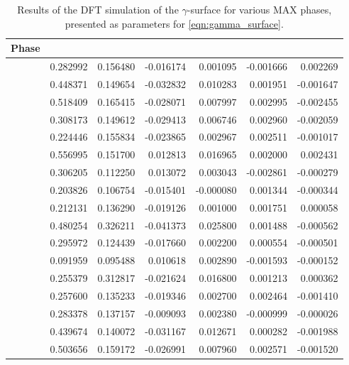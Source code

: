 \begin{table}
\centering
\begin{tabular}{|l|d{6}|d{6}|d{6}|d{6}|d{6}|d{6}|}
\hline
   Phase\rule[3ex]{0pt}{0pt} &         &         &         &         &         &         \\
\hline
   \rule[3ex]{0pt}{0pt}   &  0.282992 &  0.156480 & -0.016174 &  0.001095 & -0.001666 &  0.002269 \\
                         &  0.448371 &  0.149654 & -0.032832 &  0.010283 &  0.001951 & -0.001647 \\
                        &  0.518409 &  0.165415 & -0.028071 &  0.007997 &  0.002995 & -0.002455 \\
                         &  0.308173 &  0.149612 & -0.029413 &  0.006746 &  0.002960 & -0.002059 \\
                         &  0.224446 &  0.155834 & -0.023865 &  0.002967 &  0.002511 & -0.001017 \\
                          &  0.556995 &  0.151700 &  0.012813 &  0.016965 &  0.002000 &  0.002431 \\
                         &  0.306205 &  0.112250 &  0.013072 &  0.003043 & -0.002861 & -0.000279 \\
                         &  0.203826 &  0.106754 & -0.015401 & -0.000080 &  0.001344 & -0.000344 \\
                         &  0.212131 &  0.136290 & -0.019126 &  0.001000 &  0.001751 &  0.000058 \\
                          &  0.480254 &  0.326211 & -0.041373 &  0.025800 &  0.001488 & -0.000562 \\
                         &  0.295972 &  0.124439 & -0.017660 &  0.002200 &  0.000554 & -0.000501 \\
                         &  0.091959 &  0.095488 &  0.010618 &  0.002890 & -0.001593 & -0.000152 \\
                          &  0.255379 &  0.312817 & -0.021624 &  0.016800 &  0.001213 &  0.000362 \\
                         &  0.257600 &  0.135233 & -0.019346 &  0.002700 &  0.002464 & -0.001410 \\
                        &  0.283378 &  0.137157 & -0.009093 &  0.002380 & -0.000999 & -0.000026 \\
                        &  0.439674 &  0.140072 & -0.031167 &  0.012671 &  0.000282 & -0.001988 \\
  \rule[-1ex]{0pt}{0pt} &  0.503656 &  0.159172 & -0.026991 &  0.007960 &  0.002571 & -0.001520 \\
\hline
\end{tabular}
\captionsetup{width=1.2\textwidth}
\caption[\texorpdfstring{$\gamma$}{gamma}-surface results]{Results of the DFT simulation of the $\gamma$-surface for various MAX phases, presented as parameters for \autoref{eqn:gamma_surface}. \label{tab:gamma_surface_params}}
\end{table}


